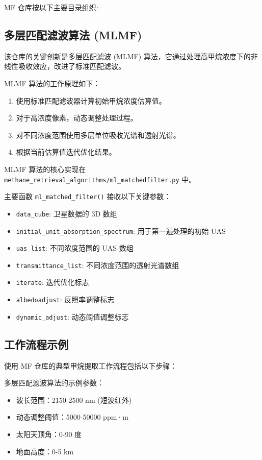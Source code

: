 MF 仓库按以下主要目录组织:

\subsection{多层匹配滤波算法
(MLMF)}\label{ux591aux5c42ux5339ux914dux6ee4ux6ce2ux7b97ux6cd5-mlmf}

该仓库的关键创新是多层匹配滤波 (MLMF)
算法，它通过处理高甲烷浓度下的非线性吸收效应，改进了标准匹配滤波。

MLMF 算法的工作原理如下：

\begin{enumerate}
\def\labelenumi{\arabic{enumi}.}
\tightlist
\item
  使用标准匹配滤波器计算初始甲烷浓度估算值。
\item
  对于高浓度像素，动态调整处理过程。
\item
  对不同浓度范围使用多层单位吸收光谱和透射光谱。
\item
  根据当前估算值迭代优化结果。
\end{enumerate}

MLMF 算法的核心实现在
\texttt{methane\_retrieval\_algorithms/ml\_matchedfilter.py} 中。

主要函数 \texttt{ml\_matched\_filter()} 接收以下关键参数：

\begin{itemize}
\tightlist
\item
  \texttt{data\_cube}: 卫星数据的 3D 数组
\item
  \texttt{initial\_unit\_absorption\_spectrum}: 用于第一遍处理的初始 UAS
\item
  \texttt{uas\_list}: 不同浓度范围的 UAS 数组
\item
  \texttt{transmittance\_list}: 不同浓度范围的透射光谱数组
\item
  \texttt{iterate}: 迭代优化标志
\item
  \texttt{albedoadjust}: 反照率调整标志
\item
  \texttt{dynamic\_adjust}: 动态阈值调整标志
\end{itemize}

\subsection{工作流程示例}\label{ux5de5ux4f5cux6d41ux7a0bux793aux4f8b}

使用 MF 仓库的典型甲烷提取工作流程包括以下步骤：

多层匹配滤波算法的示例参数：

\begin{itemize}
\item
  波长范围：2150-2500 nm (短波红外)
\item
  动态调整阈值：5000-50000 ppm·m
\item
  太阳天顶角：0-90 度
\item
  地面高度：0-5 km
\end{itemize}

